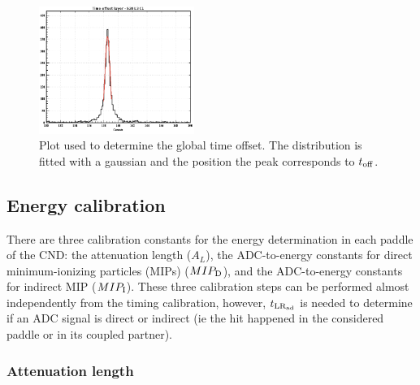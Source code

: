 \begin{figure}[htb]
\begin{center}
\includegraphics[width=0.45\textwidth]{Figure/timeoff.png} 
\end{center}
\caption{Plot used to determine the global time offset. The distribution is fitted with a gaussian and the position the peak corresponds to $t_{\rm{off}}$.}
\label{toff}
\end{figure}

\subsection{Energy calibration}

There are three calibration constants for the energy determination in each paddle of the CND: the attenuation length ($A_{L}$), the ADC-to-energy constants for direct minimum-ionizing particles (MIPs) ($MIP_{\rm{D}}$), and the ADC-to-energy constants for indirect MIP ($MIP_{\rm{I}}$).
These three calibration steps can be performed almost independently from the timing calibration, however, $t_{\rm{LR_{\rm{ad}}}}$ is needed to determine if an ADC signal is direct or indirect (ie the hit happened in the considered paddle or in its coupled partner).

\subsubsection{Attenuation length }

